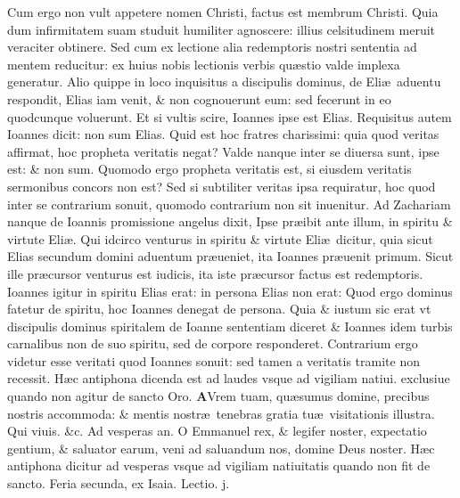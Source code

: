 \documentclass[a5paper,10pt]{book}
\def\ae{æ}
\begin{document}
\begin{multicols*}{2}
Cum ergo non vult appetere nomen Christi, factus est membrum Christi.
Quia dum infirmitatem suam studuit humiliter agnoscere: illius celsitudinem meruit veraciter obtinere. Sed cum ex lectione alia redemptoris nostri sententia ad mentem reducitur: ex huius nobis lectionis verbis qu\ae stio valde implexa generatur.
Alio quippe in loco inquisitus a discipulis dominus, de Eli\ae \ aduentu respondit, Elias iam venit, \& non cognouerunt eum: sed fecerunt in eo quodcunque voluerunt.
Et si vultis scire, Ioannes ipse est Elias.
Requisitus autem Ioannes dicit: non sum Elias.
Quid est hoc fratres charissimi: quia quod veritas affirmat, hoc propheta veritatis negat?
Valde nanque inter se diuersa sunt, ipse est: \& non sum.
Quomodo ergo propheta veritatis est, si eiusdem veritatis sermonibus concors non est?
Sed si subtiliter veritas ipsa requiratur, hoc quod inter se contrarium sonuit, quomodo contrarium non sit inuenitur.
Ad Zachariam nanque de Ioannis promissione angelus dixit, Ipse pr\ae ibit ante illum, in spiritu \& virtute Eli\ae .
Qui idcirco venturus in spiritu \& virtute Eli\ae \ dicitur, quia sicut
Elias secundum domini aduentum pr\ae ueniet, ita Ioannes pr\ae uenit primum.
Sicut ille pr\ae cursor venturus est iudicis, ita iste pr\ae cursor factus est redemptoris.
Ioannes igitur in spiritu Elias erat: in persona Elias non erat: Quod ergo dominus fatetur de spiritu, hoc Ioannes denegat de persona.
Quia \& iustum sic erat vt discipulis dominus spiritalem de Ioanne sententiam diceret \& Ioannes idem turbis carnalibus non de suo spiritu, sed de corpore responderet.
Contrarium ergo videtur esse veritati quod Ioannes sonuit: sed tamen a veritatis tramite non recessit.
\newline \color{red} H\ae c antiphona dicenda est ad laudes vsque ad vigiliam natiui. exclusiue quando non agitur de sancto Oro. \color{black}
\vspace{-.25em}
\lettrine[lines=2]{\bfseries \color{red} A}{}Vrem tuam, qu\ae sumus domine, precibus nostris accommoda: \& mentis nostr\ae \ tenebras gratia tu\ae \ visitationis illustra. Qui viuis. \&c. \color{red} Ad vesperas an. \color{black} O Emmanuel rex, \& legifer noster, expectatio gentium, \& saluator earum, veni ad saluandum nos, domine Deus noster.
\newline \color{red} H\ae c antiphona dicitur ad vesperas vsque ad vigiliam natiuitatis quando non fit de sancto. \color{black}
\newline {} \color{red} \hypertarget{MON-TERTIA-ADV}{Feria secunda,} ex Isaia. \hfill Lectio. j. \color{black}

\end{multicols*}
\end{document}
